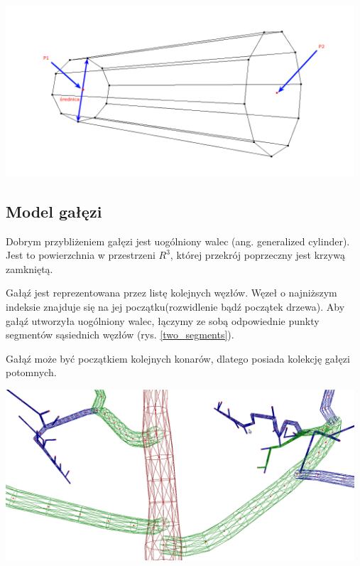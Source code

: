 \begin{center}
	\includegraphics[width=130mm]{images/model/two_segments.png}
	\label{two_segments}
\end{center}

\subsection{Model gałęzi}
Dobrym przybliżeniem gałęzi jest uogólniony walec (ang. generalized cylinder). Jest to powierzchnia w przestrzeni $R^3$, której przekrój poprzeczny jest krzywą zamkniętą.

Gałąź jest reprezentowana przez listę kolejnych węzłów. Węzeł o najniższym indeksie znajduje się na jej początku(rozwidlenie bądź początek drzewa). Aby gałąź utworzyła uogólniony walec, łączymy ze sobą odpowiednie punkty segmentów sąsiednich węzłów (rys. \ref{two_segments}).

Gałąź może być początkiem kolejnych konarów, dlatego posiada kolekcję gałęzi potomnych.

\begin{center}
	\includegraphics[width=130mm]{images/model/branching.png}
	\label{branching}
\end{center}
